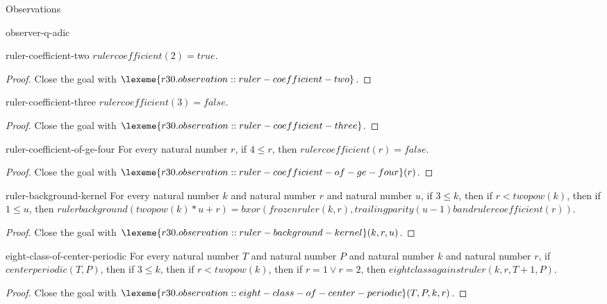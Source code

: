 \begin{lexlean}{Observations}
\begin{section}{observer-q-adic}
\begin{theorem}{ruler-coefficient-two}
\(rulercoefficient(2) = true\).
\begin{proof}
Close the goal with \(\lexeme{r30.observation::ruler-coefficient-two}\).
\end{proof}
\end{theorem}

\begin{theorem}{ruler-coefficient-three}
\(rulercoefficient(3) = false\).
\begin{proof}
Close the goal with \(\lexeme{r30.observation::ruler-coefficient-three}\).
\end{proof}
\end{theorem}

\begin{theorem}{ruler-coefficient-of-ge-four}
For every natural number \(r\), if \(4 ≤ r\), then \(rulercoefficient(r) = false\).
\begin{proof}
Close the goal with \(\lexeme{r30.observation::ruler-coefficient-of-ge-four}(r)\).
\end{proof}
\end{theorem}

\begin{theorem}{ruler-background-kernel}
For every natural number \(k\) and natural number \(r\) and natural number \(u\), if \(3 ≤ k\), then if \(r < twopow(k)\), then if \(1 ≤ u\), then \(rulerbackground(twopow(k) * u + r) = bxor(frozenruler(k, r), trailingparity(u - 1) band rulercoefficient(r))\).
\begin{proof}
Close the goal with \(\lexeme{r30.observation::ruler-background-kernel}(k, r, u)\).
\end{proof}
\end{theorem}

\begin{theorem}{eight-class-of-center-periodic}
For every natural number \(T\) and natural number \(P\) and natural number \(k\) and natural number \(r\), if \(centerperiodic(T, P)\), then if \(3 ≤ k\), then if \(r < twopow(k)\), then if \(r = 1 ∨ r = 2\), then \(eightclassagainstruler(k, r, T + 1, P)\).
\begin{proof}
Close the goal with \(\lexeme{r30.observation::eight-class-of-center-periodic}(T, P, k, r)\).
\end{proof}
\end{theorem}


\end{section}
\end{lexlean}
